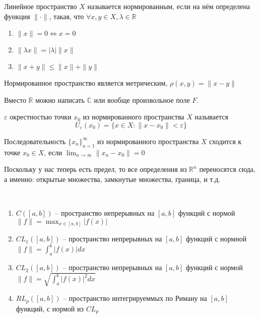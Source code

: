 \documentclass[document.tex]{subfiles}
\begin{document}
\begin{definition}
    Линейное пространство $X$ называется нормированным, если на нём определена функция $\| \cdot \|$, такая, что
    $\forall x, y \in X, \lambda \in \mathbb{R}$
    \begin{enumerate}
        \item $\|x\| = 0 \Leftrightarrow x = 0$
        \item $\|\lambda x\| = |\lambda| \|x\|$
        \item $\|x + y\| \leq \|x\| + \|y\|$
    \end{enumerate}
\end{definition}

\begin{remark}
    Нормированное пространство является метрическим, $\rho(x, y) = \|x - y\|$
\end{remark}

\begin{remark}
    Вместо $\mathbb{R}$ можно написать $\mathbb{C}$ или вообще произвольное поле $F$.
\end{remark}


\begin{definition}
    $\varepsilon$ окрестностью точки $x_0$ из нормированного пространства $X$ называется
    \[
        U_{\varepsilon}(x_0) = \{x \in X : \|x - x_0\| < \varepsilon\}
    \]
\end{definition}

\begin{definition}
    Последовательность $\{x_n\}_{n = 1}^{\infty}$ из нормированного пространства $X$ сходится к точке $x_0 \in X$, если
    $\lim_{n \rightarrow \infty} \|x_n - x_0\| = 0$
\end{definition}

\begin{remark}
    Поскольку у нас теперь есть предел, то все определения из $\mathbb{R}^n$ переносятся сюда, а именно: открытые
    множества, замкнутые множества, граница, и т.д.
\end{remark}

\begin{example}
    ~\begin{enumerate}
        \item $C([a, b])$ -- пространство непрерывных на $[a, b]$ функций с нормой $\|f\| = \max_{x \in [a, b]} |f(x)|$ 
        \item $CL_{1} ([a, b])$ -- пространство непрерывных на $[a, b]$ функций с нормной $\|f\| = \int_{a}^{b} |f(x)| dx$
        \item $CL_{2} ([a, b])$ -- пространство непрерывных на $[a, b]$ функций с нормой $\|f\| = \sqrt{\int_{a}^{b}
            |f(x)|^2 dx}$

        \item $RL_{p} ([a, b])$ -- пространство интегрируеммых по Риману на $[a, b]$ функций, с нормой из $CL_{p}$
    \end{enumerate}
\end{example}
\end{document}

